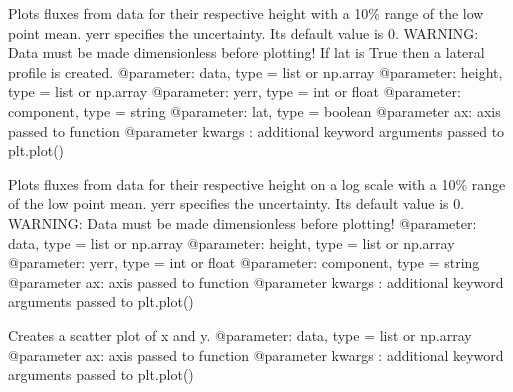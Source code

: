 \documentclass[letterpaper,10pt,english]{sphinxmanual}
\begin{document}

\begin{fulllineitems}
\label{\detokenize{index:windtunnel.plot_fluxes}}
Plots fluxes from data for their respective height with a 10\% range of
the low point mean. yerr specifies the uncertainty. Its default value is 0.
WARNING: Data must be made dimensionless before plotting! If lat is True 
then a lateral profile is created.
@parameter: data, type = list or np.array
@parameter: height, type = list or np.array
@parameter: yerr, type = int or float
@parameter: component, type = string
@parameter: lat, type = boolean
@parameter ax: axis passed to function
@parameter kwargs : additional keyword arguments passed to plt.plot()

\end{fulllineitems}


\begin{fulllineitems}
\label{\detokenize{index:windtunnel.plot_fluxes_log}}
Plots fluxes from data for their respective height on a log scale with
a 10\% range of the low point mean. yerr specifies the uncertainty. Its 
default value is 0. WARNING: Data must be made dimensionless before 
plotting!
@parameter: data, type = list or np.array
@parameter: height, type = list or np.array
@parameter: yerr, type = int or float
@parameter: component, type = string
@parameter ax: axis passed to function
@parameter kwargs : additional keyword arguments passed to plt.plot()

\end{fulllineitems}


\begin{fulllineitems}
\label{\detokenize{index:windtunnel.plot_hist}}
Creates a scatter plot of x and y.
@parameter: data, type = list or np.array
@parameter ax: axis passed to function
@parameter kwargs : additional keyword arguments passed to plt.plot()

\end{fulllineitems}
\end{document}
